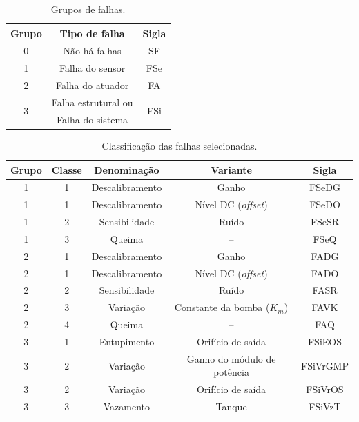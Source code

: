 \begin{table}[htb]
\centering
\caption{Grupos de falhas.}
\label{tab:grupos_falhas}
\vspace{0.25cm}
\begin{tabular}{|c|c|c|}
\hline
{\bf Grupo} & {\bf Tipo de falha} & {\bf Sigla}\\
\hline
\hline
0 & Não há falhas & SF\\
\hline
1 & Falha do sensor & FSe\\
\hline
2 & Falha do atuador & FA\\
\hline
\multirow{2}{*}{3} & 
Falha estrutural ou & 
\multirow{2}{*}{FSi}\\
&
Falha do sistema & 
\\
\hline
\end{tabular}
\end{table}

\begin{table}[htb]
\centering
\caption{Classificação das falhas selecionadas.}
\label{tab:classificacao_falhas}
\vspace{0.25cm}
\begin{tabular}{|c|c|c|c|c|}
\hline
{\bf Grupo} & {\bf Classe} & {\bf Denominação} & {\bf Variante} & {\bf Sigla}\\
\hline
1 & 1 & Descalibramento & Ganho & FSeDG\\
\hline
1 & 1 & Descalibramento & Nível DC ({\it offset}) & FSeDO\\
\hline
1 & 2 & Sensibilidade & Ruído & FSeSR\\
\hline
1 & 3 & Queima & -- & FSeQ\\
\hline
\hline
2 & 1 & Descalibramento & Ganho & FADG\\
\hline
2 & 1 & Descalibramento & Nível DC ({\it offset}) & FADO\\
\hline
2 & 2 & Sensibilidade & Ruído & FASR\\
\hline
2 & 3 & Variação & Constante da bomba ($K_m$) & FAVK\\
\hline
2 & 4 & Queima & -- & FAQ\\
\hline
\hline
3 & 1 & Entupimento & Orifício de saída & FSiEOS\\
\hline
3 & 2 & Variação & Ganho do módulo de potência & FSiVrGMP\\
\hline
3 & 2 & Variação & Orifício de saída & FSiVrOS\\
\hline
3 & 3 & Vazamento & Tanque & FSiVzT\\
\hline
\end{tabular}
\end{table}

